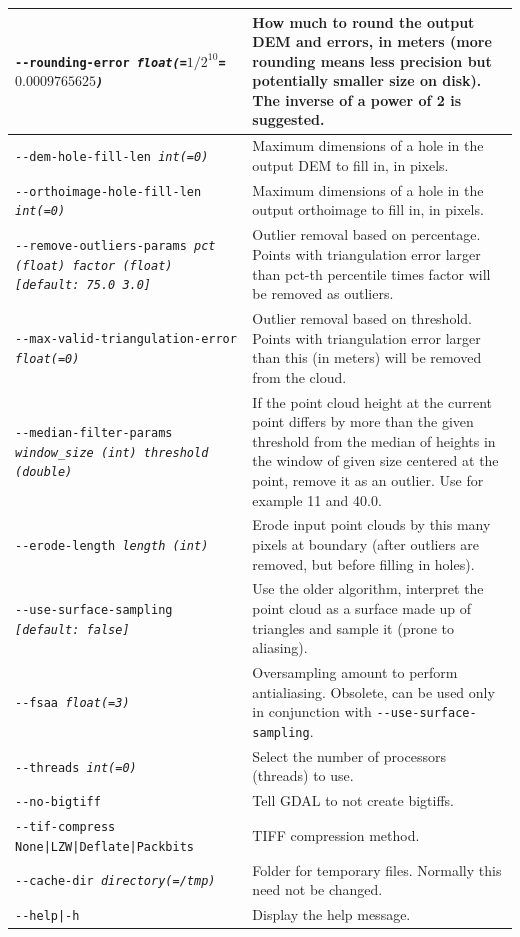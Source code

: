 \begin{longtable}{|p{8cm}|p{9cm}|}
\texttt{-\/-rounding-error \textit{float(=$1/2^{10}$=$0.0009765625$)}} & How much to round the output DEM and errors, in meters (more rounding means less precision but potentially smaller size on disk). The inverse of a power of 2 is suggested. \\ \hline
\texttt{-\/-dem-hole-fill-len \textit{int(=0)}} &  Maximum dimensions of a hole in the output DEM to fill in, in pixels. \\ \hline
\texttt{-\/-orthoimage-hole-fill-len \textit{int(=0)}} & Maximum dimensions of a hole in the output orthoimage to fill in, in pixels. \\ \hline
\texttt{-\/-remove-outliers-params  \textit{pct (float) factor (float) [default: 75.0 3.0]}} & Outlier removal based on percentage. Points with triangulation error larger than pct-th percentile times factor will be removed as outliers. \\ \hline
\texttt{-\/-max-valid-triangulation-error \textit{float(=0)}} & Outlier removal based on threshold. Points with triangulation error larger than this (in meters) will be removed from the cloud. \\ \hline
\texttt{-\/-median-filter-params \textit{window\_size (int) threshold (double)}} & If the point cloud height at the current point differs by more than the given threshold from the median of heights in the window of given size centered at the point, remove it as an outlier. Use for example 11 and 40.0.\\ \hline
\texttt{-\/-erode-length \textit{length (int)}} & Erode input point clouds by this many pixels at boundary (after outliers are removed, but before filling in holes). \\ \hline
\texttt{-\/-use-surface-sampling \textit{[default: false]}} & Use the older algorithm, interpret the point cloud as a surface made up of triangles and sample it (prone to aliasing).\\ \hline
\texttt{-\/-fsaa  \textit{float(=3)}} & Oversampling amount to perform antialiasing. Obsolete, can be used only in conjunction with \texttt{-\/-use-surface-sampling}. \\ \hline
\texttt{-\/-threads \textit{int(=0)}} & Select the number of processors (threads) to use.\\ \hline
\texttt{-\/-no-bigtiff} & Tell GDAL to not create bigtiffs.\\ \hline
\texttt{-\/-tif-compress None|LZW|Deflate|Packbits} & TIFF compression method.\\ \hline
\texttt{-\/-cache-dir \textit{directory(=/tmp)}} & Folder for temporary files. Normally this need not be changed.\\ \hline
\hline
\texttt{-\/-help|-h} & Display the help message. \\ \hline
\end{longtable}

